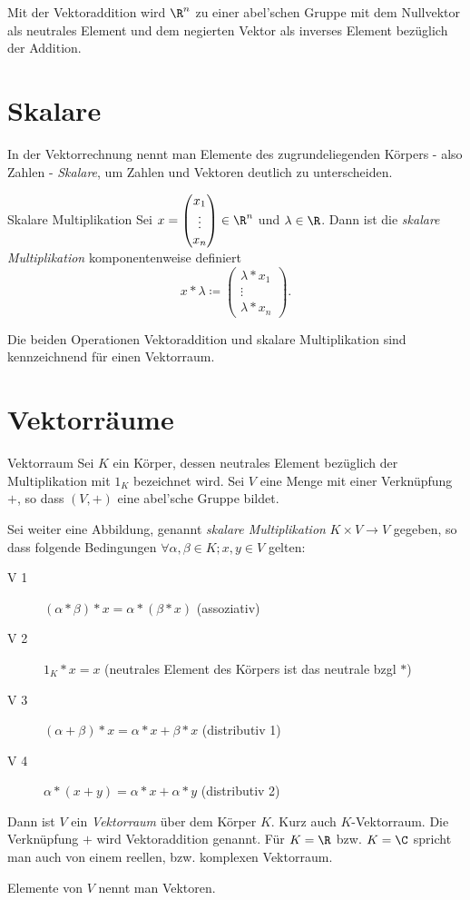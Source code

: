 Mit der Vektoraddition wird $\R^n$ zu einer abel'schen Gruppe mit dem Nullvektor als neutrales Element und dem negierten Vektor als inverses Element bezüglich der Addition.

\section{Skalare}

In der Vektorrechnung nennt man Elemente des zugrundeliegenden Körpers - also Zahlen - \emph{Skalare}, um Zahlen und Vektoren deutlich zu unterscheiden.

\begin{definition}{Skalare Multiplikation}
	Sei $x = \begin{pmatrix}
	x_1\\
	\vdots\\
	x_n
	\end{pmatrix} \in \R^n$ und $\lambda\in\R$. Dann ist die \emph{skalare Multiplikation} komponentenweise definiert
	\begin{equation*}
		x*\lambda \coloneqq \begin{pmatrix}
		\lambda* x_1\\
		\vdots\\
		\lambda* x_n
		\end{pmatrix}.
	\end{equation*}
\end{definition}



Die beiden Operationen Vektoraddition und skalare Multiplikation sind kennzeichnend für einen Vektorraum.

\section{Vektorräume}
\begin{definition}{Vektorraum}
	Sei $K$ ein Körper, dessen neutrales Element bezüglich der Multiplikation mit $1_K$ bezeichnet wird. Sei $V$ eine Menge mit einer Verknüpfung $+$, so dass $(V,+)$ eine abel'sche Gruppe bildet.

	Sei weiter eine Abbildung, genannt \emph{skalare Multiplikation} $K\times V\rightarrow V$ gegeben, so dass folgende Bedingungen $\forall \alpha,\beta \in K; x,y\in V$ gelten:

	\begin{description}
	  \item[V 1] $(\alpha*\beta)* x=\alpha*(\beta* x)$ (assoziativ)
	  \item[V 2] $1_K* x = x$ (neutrales Element des Körpers ist das neutrale bzgl $*$)
	  \item[V 3] $(\alpha+\beta)* x=\alpha * x + \beta* x$ (distributiv 1)
	  \item[V 4] $\alpha* (x+y)=\alpha * x + \alpha* y$ (distributiv 2)
	\end{description}
	Dann ist $V$ ein \emph{Vektorraum} über dem Körper $K$. Kurz auch $K$-Vektorraum. Die Verknüpfung $+$ wird Vektoraddition genannt. Für $K=\R$ bzw. $K=\C$ spricht man auch von einem reellen, bzw. komplexen Vektorraum.

	Elemente von $V$ nennt man Vektoren.
\end{definition}

